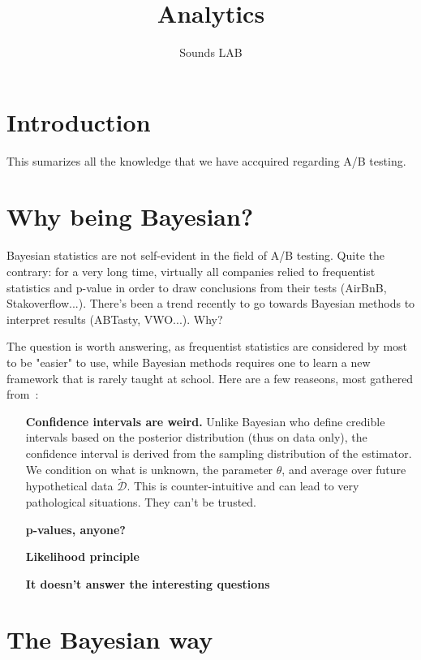 \documentclass{tufte-book}
\title{Analytics}
\author[]{Sounds LAB}
\begin{document}
\maketitle

\tableofcontents

\cleardoublepage
\chapter*{Introduction}

This sumarizes all the knowledge that we have accquired regarding A/B testing.

\chapter{Why being Bayesian?}
\label{chap:why_bayes}

Bayesian statistics are not self-evident in the field of A/B testing. Quite the contrary: for a very long
time, virtually all companies relied to frequentist statistics and p-value in order to draw conclusions from
their tests (AirBnB, Stakoverflow...). There's been a trend recently to go towards Bayesian methods to
interpret results (ABTasty, VWO...). Why?

The question is worth answering, as frequentist statistics are considered by most to be "easier" to use, while
Bayesian methods requires one to learn a new framework that is rarely taught at school. Here are a few
reaseons, most gathered from~\cite{Murphy2012}:


\begin{itemize}
  \item[\textbf{Confidence intervals are weird.}] Unlike Bayesian who define credible intervals based on the
    posterior distribution (thus on data only), the confidence interval is derived from the sampling
    distribution of the estimator. We condition on what is unknown, the parameter $\theta$, and average over
    future hypothetical data $\tilde{\mathcal{D}}$. This is counter-intuitive and can lead to very
    pathological situations. They can't be trusted.
  \item[\textbf{p-values, anyone?}]
  \item[\textbf{Likelihood principle}]
  \item[\textbf{It doesn't answer the interesting questions}]
\end{itemize}

\chapter{The Bayesian way}
\label{chap:Bayes}
\end{document}
